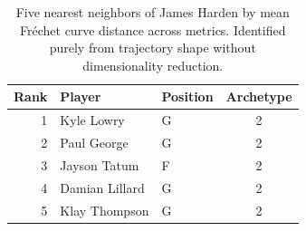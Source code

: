 \begin{table}[htbp]
  \centering\small
  \begin{tabular}{rllc}
    \toprule
    Rank & Player & Position & Archetype \\
    \midrule
    1 & Kyle Lowry & G & 2 \\
    2 & Paul George & G & 2 \\
    3 & Jayson Tatum & F & 2 \\
    4 & Damian Lillard & G & 2 \\
    5 & Klay Thompson & G & 2 \\
    \bottomrule
  \end{tabular}
  \caption{Five nearest neighbors of James Harden by mean Fr\'{e}chet curve distance across metrics. Identified purely from trajectory shape without dimensionality reduction.}
  \label{tab:James_Harden_frechet_curve_neighbors}
\end{table}


